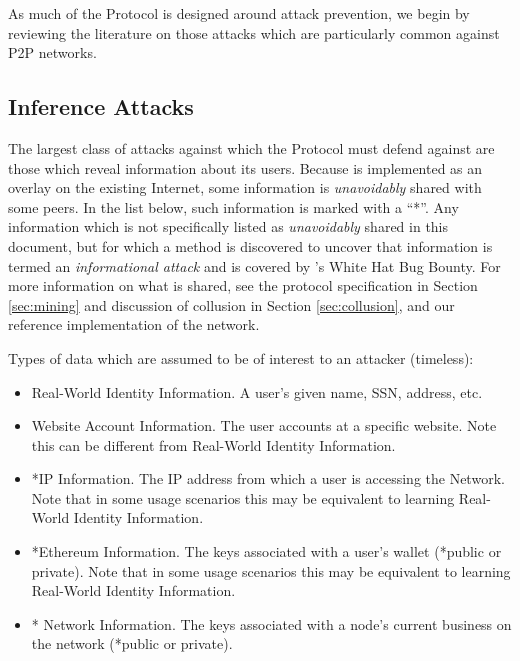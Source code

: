 
As much of the \Orchid{} Protocol is designed around attack prevention, we begin by reviewing
the literature on those attacks which are particularly common against
P2P networks.

\subsection*{Inference Attacks}
\label{inference-attacks}

The largest class of attacks against which the \Orchid{} Protocol must defend against are those which reveal information about its users. Because \Orchid{} is implemented as an overlay on the existing Internet, some information is \emph{unavoidably} shared with some peers. In the list below, such information is marked with a “*”. Any information which is not specifically listed as \emph{unavoidably} shared in this document, but for which a method is discovered to uncover that information is termed an \emph{informational attack} and is covered by \Orchid’s White Hat Bug Bounty. For more information on what is shared, see the protocol specification in Section \ref{sec:mining} and discussion of collusion in Section \ref{sec:collusion}, and our reference implementation of the network\cite{oursoftware}.

Types of data which are assumed to be of interest to an attacker (timeless):

\begin{itemize}
\item Real-World Identity Information. A user’s given name, SSN, address, etc.
\item Website Account Information. The user accounts at a specific website. Note this can be different from Real-World Identity Information.
\item *IP Information. The IP address from which a user is accessing the \Orchid{} Network. Note that in some usage scenarios this may be equivalent to learning Real-World Identity Information.
\item *Ethereum Information. The keys associated with a user’s wallet (*public or private). Note that in some usage scenarios this may be equivalent to learning Real-World Identity Information.
\item *\Orchid{} Network Information. The keys associated with a node’s current business on the \Orchid{} network (*public or private).
\end{itemize}

